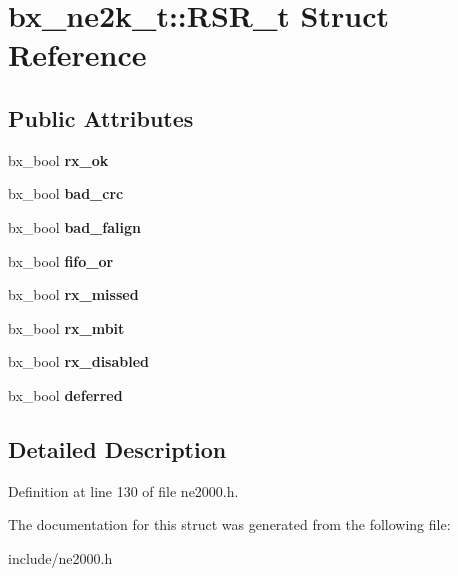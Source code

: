 \hypertarget{structbx__ne2k__t_1_1RSR__t}{\section{bx\-\_\-ne2k\-\_\-t\-:\-:R\-S\-R\-\_\-t Struct Reference}
\label{structbx__ne2k__t_1_1RSR__t}
}
\subsection*{Public Attributes}
\begin{DoxyCompactItemize}
\item 
\hypertarget{structbx__ne2k__t_1_1RSR__t_aafa28e5d6056426a6daeb5d3490be9fb}{bx\-\_\-bool {\bfseries rx\-\_\-ok}}\label{structbx__ne2k__t_1_1RSR__t_aafa28e5d6056426a6daeb5d3490be9fb}

\item 
\hypertarget{structbx__ne2k__t_1_1RSR__t_ae12259848d2ef4b148bb56676647f4de}{bx\-\_\-bool {\bfseries bad\-\_\-crc}}\label{structbx__ne2k__t_1_1RSR__t_ae12259848d2ef4b148bb56676647f4de}

\item 
\hypertarget{structbx__ne2k__t_1_1RSR__t_a10e038db3365fe7348d9c03f69cdcf5d}{bx\-\_\-bool {\bfseries bad\-\_\-falign}}\label{structbx__ne2k__t_1_1RSR__t_a10e038db3365fe7348d9c03f69cdcf5d}

\item 
\hypertarget{structbx__ne2k__t_1_1RSR__t_a9a97b740657a75e56ccdbab3143fbe7c}{bx\-\_\-bool {\bfseries fifo\-\_\-or}}\label{structbx__ne2k__t_1_1RSR__t_a9a97b740657a75e56ccdbab3143fbe7c}

\item 
\hypertarget{structbx__ne2k__t_1_1RSR__t_aaa24c779be42438212f2bfbc09f14e6b}{bx\-\_\-bool {\bfseries rx\-\_\-missed}}\label{structbx__ne2k__t_1_1RSR__t_aaa24c779be42438212f2bfbc09f14e6b}

\item 
\hypertarget{structbx__ne2k__t_1_1RSR__t_a1f9946a77f58b66c427685fbc5f5a968}{bx\-\_\-bool {\bfseries rx\-\_\-mbit}}\label{structbx__ne2k__t_1_1RSR__t_a1f9946a77f58b66c427685fbc5f5a968}

\item 
\hypertarget{structbx__ne2k__t_1_1RSR__t_a48a37f894e93c9ada6faeef294a1601b}{bx\-\_\-bool {\bfseries rx\-\_\-disabled}}\label{structbx__ne2k__t_1_1RSR__t_a48a37f894e93c9ada6faeef294a1601b}

\item 
\hypertarget{structbx__ne2k__t_1_1RSR__t_a308793b62c36c1ed2d380981753ca346}{bx\-\_\-bool {\bfseries deferred}}\label{structbx__ne2k__t_1_1RSR__t_a308793b62c36c1ed2d380981753ca346}

\end{DoxyCompactItemize}


\subsection{Detailed Description}


Definition at line 130 of file ne2000.\-h.



The documentation for this struct was generated from the following file\-:\begin{DoxyCompactItemize}
\item 
include/ne2000.\-h\end{DoxyCompactItemize}
